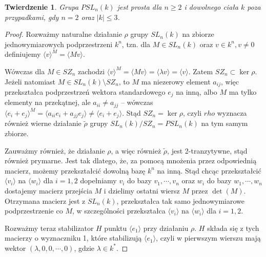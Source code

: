 \documentclass[licencjacka]{pracamgr}
\newtheorem{thh}{Twierdzenie}[section]
\begin{document}
\begin{thh}
  Grupa $PSL_n(k)$ jest prosta dla $n \ge 2$ i dowolnego ciała $k$ poza przypadkami, gdy $n = 2$ oraz $|k| \le 3$.
\end{thh}
\begin{proof}
  Rozważmy naturalne działanie $\rho$ grupy $SL_n(k)$ na zbiorze jednowymiarowych podprzestrzeni $k^n$,
  tzn. dla $M \in SL_n(k)$ oraz $v \in k^n, v \ne 0$ definiujemy $\langle v \rangle ^ M = \langle Mv \rangle$.
  
  Wówczas dla $M \in SZ_n$ zachodzi $\langle v \rangle ^ M = \langle M v \rangle = \langle \lambda v \rangle = \langle v \rangle$.
  Zatem $SZ_n \subset \ker \rho$. Jeżeli natomiast $M \in SL_n(k) \setminus SZ_n$, to $M$ ma niezerowy element $a_{i j}$, 
  więc przekształca podprzestrzeń wektora standardowego $e_j$ na inną, albo $M$ ma tylko elementy na przekątnej, 
  ale $a_{i i} \ne a_{j j}$ -- wówczas $\langle e_i + e_j \rangle^M = \langle a_{i i} e_i + a_{j j} e_j \rangle \ne \langle  e_i + e_j \rangle$.
  Stąd $SZ_n = \ker \rho$, czyli $rho$ wyznacza również wierne działanie $\tilde{\rho}$ grupy $SL_n(k) / SZ_n = PSL_n(k)$ na tym samym zbiorze.

  Zauważmy również, że działanie $\rho$, a więc również $\tilde{\rho}$, jest 2-tranzytywne, stąd również prymarne.
  Jest tak dlatego, że, za pomocą mnożenia przez odpowiednią macierz, możemy przekształcić dowolną bazę $k^n$ na inną.
  Stąd chcąc przekształcić $\langle v_i \rangle$ na $\langle w_i \rangle$ dla $i = 1, 2$ dopełniamy $v_i$ do bazy $v_1, \cdots, v_n$
  oraz $w_i$ do bazy $w_1, \cdots, w_n$ dostajemy macierz przejścia $M$ i dzielimy ostatni wiersz $M$ przez $\det(M)$.
  Otrzymana macierz jest z $SL_n(k)$, przekształca tak samo jednowymiarowe podprzestrzenie co $M$, w szczególności przekształca 
  $\langle v_i \rangle$ na $\langle w_i \rangle$ dla $i = 1, 2$.

  Rozważmy teraz stabilizator $H$ punktu $\langle e_1 \rangle$ przy działaniu $\rho$.
  $H$ składa się z tych macierzy o wyznaczniku 1, które stabilizują $\langle e_1 \rangle$,
  czyli w pierwszym wierszu mają wektor $(\lambda, 0, 0, \cdots, 0)$, gdzie $\lambda \in k^*$.


\end{proof}
\end{document}
